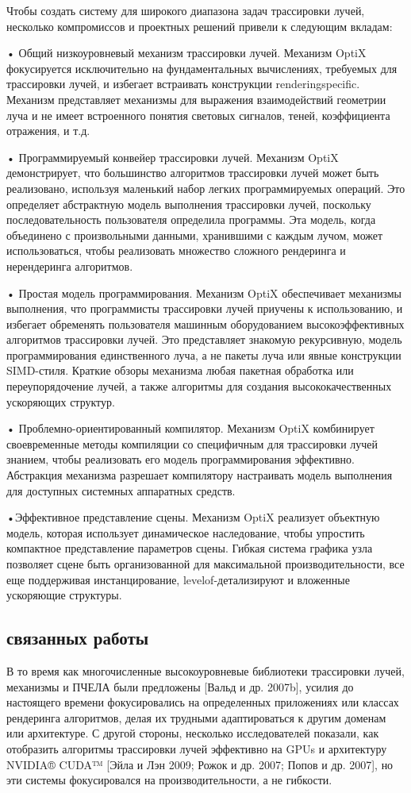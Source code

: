 Чтобы создать систему для широкого диапазона задач трассировки лучей, несколько компромиссов и проектных решений привели к следующим вкладам:

• Общий низкоуровневый механизм трассировки лучей. Механизм OptiX фокусируется исключительно на фундаментальных вычислениях, требуемых для трассировки лучей, и избегает встраивать конструкции renderingspecific. Механизм представляет механизмы для выражения взаимодействий геометрии луча и не имеет встроенного понятия световых сигналов, теней, коэффициента отражения, и т.д.

• Программируемый конвейер трассировки лучей. Механизм OptiX демонстрирует, что большинство алгоритмов трассировки лучей может быть реализовано, используя маленький набор легких программируемых операций. Это определяет абстрактную модель выполнения трассировки лучей, поскольку последовательность пользователя определила программы. Эта модель, когда объединено с произвольными данными, хранившими с каждым лучом, может использоваться, чтобы реализовать множество сложного рендеринга и нерендеринга алгоритмов.

• Простая модель программирования. Механизм OptiX обеспечивает механизмы выполнения, что программисты трассировки лучей приучены к использованию, и избегает обременять пользователя машинным оборудованием высокоэффективных алгоритмов трассировки лучей. Это представляет знакомую рекурсивную, модель программирования единственного луча, а не пакеты луча или явные конструкции SIMD-стиля. Краткие обзоры механизма любая пакетная обработка или переупорядочение лучей, а также алгоритмы для создания высококачественных ускоряющих структур.

• Проблемно-ориентированный компилятор. Механизм OptiX комбинирует своевременные методы компиляции со специфичным для трассировки лучей знанием, чтобы реализовать его модель программирования эффективно. Абстракция механизма разрешает компилятору настраивать модель выполнения для доступных системных аппаратных средств.

•Эффективное представление сцены. Механизм OptiX реализует объектную модель, которая использует динамическое наследование, чтобы упростить компактное представление параметров сцены. Гибкая система графика узла позволяет сцене быть организованной для максимальной производительности, все еще поддерживая инстанцирование, levelof-детализируют и вложенные ускоряющие структуры.

\subsection{связанных работы}
В то время как многочисленные высокоуровневые библиотеки трассировки лучей, механизмы и ПЧЕЛА были предложены [Вальд и др. 2007b], усилия до настоящего времени фокусировались на определенных приложениях или классах рендеринга алгоритмов, делая их трудными адаптироваться к другим доменам или архитектуре. С другой стороны, несколько исследователей показали, как отобразить алгоритмы трассировки лучей эффективно на GPUs и архитектуру NVIDIA® CUDA™ [Эйла и Лэн 2009; Рожок и др. 2007; Попов и др. 2007], но эти системы фокусировался на производительности, а не гибкости.

